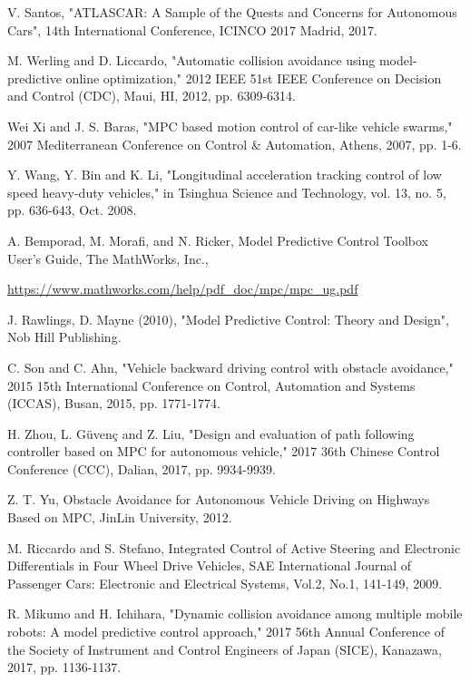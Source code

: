 \documentclass[conference, 11pt]{IEEEtran}
\begin{document}
\begin{thebibliography}{00}
	V. Santos, "ATLASCAR: A Sample of the Quests and Concerns for Autonomous Cars", 14th International Conference, ICINCO 2017 Madrid, 2017.
		
	
	
	M. Werling and D. Liccardo, "Automatic collision avoidance using model-predictive online optimization," 2012 IEEE 51st IEEE Conference on Decision and Control (CDC), Maui, HI, 2012, pp. 6309-6314.
	
	Wei Xi and J. S. Baras, "MPC based motion control of car-like vehicle swarms," 2007 Mediterranean Conference on Control \& Automation, Athens, 2007, pp. 1-6.
	
	
	Y. Wang, Y. Bin and K. Li, "Longitudinal acceleration tracking control of low speed heavy-duty vehicles," in Tsinghua Science and Technology, vol. 13, no. 5, pp. 636-643, Oct. 2008.
	
	

	

	
	
	
	A. Bemporad, M. Morafi, and N. Ricker, Model Predictive Control Toolbox User’s Guide, The MathWorks, Inc.,
	
		\url{https://www.mathworks.com/help/pdf_doc/mpc/mpc_ug.pdf}
		
	J. Rawlings, D. Mayne (2010), "Model Predictive Control: Theory and Design", Nob Hill Publishing.	
	
	C. Son and C. Ahn, "Vehicle backward driving control with obstacle avoidance," 2015 15th International Conference on Control, Automation and Systems (ICCAS), Busan, 2015, pp. 1771-1774.
	
	
	H. Zhou, L. Güvenç and Z. Liu, "Design and evaluation of path following controller based on MPC for autonomous vehicle," 2017 36th Chinese Control Conference (CCC), Dalian, 2017, pp. 9934-9939.
	
	 Z. T. Yu, Obstacle Avoidance for Autonomous Vehicle Driving on Highways Based on MPC, JinLin University, 2012.
	
	M. Riccardo and S. Stefano, Integrated Control of Active Steering and Electronic Differentials in Four Wheel Drive Vehicles,
	SAE International Journal of Passenger Cars: Electronic and Electrical Systems, Vol.2, No.1, 141-149, 2009.
	
	R. Mikumo and H. Ichihara, "Dynamic collision avoidance among multiple mobile robots: A model predictive control approach," 2017 56th Annual Conference of the Society of Instrument and Control Engineers of Japan (SICE), Kanazawa, 2017, pp. 1136-1137.
	

\end{thebibliography}
\end{document}
